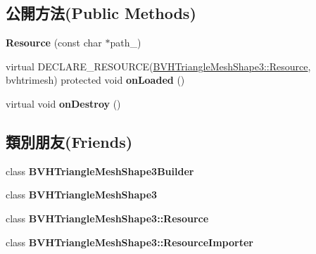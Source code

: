 \subsection*{公開方法(Public Methods)}
\begin{DoxyCompactItemize}
\item 
{\bfseries Resource} (const char $\ast$path\+\_\+)\hypertarget{class_magnum_1_1_b_v_h_triangle_mesh_shape3_1_1_resource_a394afca7fe309f0f99d0eae11843700b}{}\label{class_magnum_1_1_b_v_h_triangle_mesh_shape3_1_1_resource_a394afca7fe309f0f99d0eae11843700b}

\item 
virtual D\+E\+C\+L\+A\+R\+E\+\_\+\+R\+E\+S\+O\+U\+R\+CE(\hyperlink{class_magnum_1_1_b_v_h_triangle_mesh_shape3_1_1_resource}{B\+V\+H\+Triangle\+Mesh\+Shape3\+::\+Resource}, bvhtrimesh) protected void {\bfseries on\+Loaded} ()\hypertarget{class_magnum_1_1_b_v_h_triangle_mesh_shape3_1_1_resource_a474438eff3a975670cd3dbd43688ae16}{}\label{class_magnum_1_1_b_v_h_triangle_mesh_shape3_1_1_resource_a474438eff3a975670cd3dbd43688ae16}

\item 
virtual void {\bfseries on\+Destroy} ()\hypertarget{class_magnum_1_1_b_v_h_triangle_mesh_shape3_1_1_resource_a138489fae41a9e7eb6d6cd1a3c1aff25}{}\label{class_magnum_1_1_b_v_h_triangle_mesh_shape3_1_1_resource_a138489fae41a9e7eb6d6cd1a3c1aff25}

\end{DoxyCompactItemize}
\subsection*{類別朋友(Friends)}
\begin{DoxyCompactItemize}
\item 
class {\bfseries B\+V\+H\+Triangle\+Mesh\+Shape3\+Builder}\hypertarget{class_magnum_1_1_b_v_h_triangle_mesh_shape3_1_1_resource_a0f649365ade947ac32bf9c7a71b53fef}{}\label{class_magnum_1_1_b_v_h_triangle_mesh_shape3_1_1_resource_a0f649365ade947ac32bf9c7a71b53fef}

\item 
class {\bfseries B\+V\+H\+Triangle\+Mesh\+Shape3}\hypertarget{class_magnum_1_1_b_v_h_triangle_mesh_shape3_1_1_resource_a7d93684b283f743d08e2f2bd03a8bbec}{}\label{class_magnum_1_1_b_v_h_triangle_mesh_shape3_1_1_resource_a7d93684b283f743d08e2f2bd03a8bbec}

\item 
class {\bfseries B\+V\+H\+Triangle\+Mesh\+Shape3\+::\+Resource}\hypertarget{class_magnum_1_1_b_v_h_triangle_mesh_shape3_1_1_resource_ac4877a9b420bd82dfa94ecb349aaf30c}{}\label{class_magnum_1_1_b_v_h_triangle_mesh_shape3_1_1_resource_ac4877a9b420bd82dfa94ecb349aaf30c}

\item 
class {\bfseries B\+V\+H\+Triangle\+Mesh\+Shape3\+::\+Resource\+Importer}\hypertarget{class_magnum_1_1_b_v_h_triangle_mesh_shape3_1_1_resource_a4cabc043c009b59e57956377e8726767}{}\label{class_magnum_1_1_b_v_h_triangle_mesh_shape3_1_1_resource_a4cabc043c009b59e57956377e8726767}

\end{DoxyCompactItemize}
